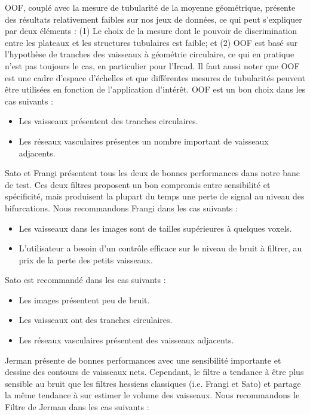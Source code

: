 OOF, couplé avec la mesure de tubularité de la moyenne géométrique, présente des résultats relativement faibles sur nos jeux de données, ce qui peut s'expliquer par deux éléments : (1) Le choix de la mesure dont le pouvoir de discrimination entre les plateaux et les structures tubulaires est faible; et (2) OOF est basé sur l'hypothèse de tranches des vaisseaux à géométrie circulaire, ce qui en pratique n'est pas toujours le cas, en particulier pour l'Ircad. Il faut aussi noter que OOF est une cadre d'espace d'échelles et que différentes mesures de tubularités peuvent être utilisées en fonction de l'application d'intérêt. OOF est un bon choix dans les cas suivants : 

\begin{itemize}
  \item Les vaisseaux présentent des tranches circulaires.
  \item Les réseaux vasculaires présentes un nombre important de vaisseaux adjacents.
\end{itemize}

Sato et Frangi présentent tous les deux de bonnes performances dans notre banc de test. Ces deux filtres proposent un bon compromis entre sensibilité et spécificité, mais produisent la plupart du temps une perte de signal au niveau des bifurcations. Nous recommandons Frangi dans les cas suivants :

\begin{itemize}
  \item Les vaisseaux dans les images sont de tailles supérieures à quelques voxels.
  \item L'utilisateur a besoin d'un contrôle efficace sur le niveau de bruit à filtrer, au prix de la perte des petits vaisseaux.
\end{itemize}

Sato est recommandé dans les cas suivants :

\begin{itemize}
  \item Les images présentent peu de bruit.
  \item Les vaisseaux ont des tranches circulaires.
  \item Les réseaux vasculaires présentent des vaisseaux adjacents.
\end{itemize}

Jerman présente de bonnes performances avec une sensibilité importante et dessine des contours de vaisseaux nets. Cependant, le filtre a tendance à être plus sensible au bruit que les filtres hessiens classiques (i.e. Frangi et Sato) et partage la même tendance à sur estimer le volume des vaisseaux. Nous recommandons le Filtre de Jerman dans les cas suivants : 

